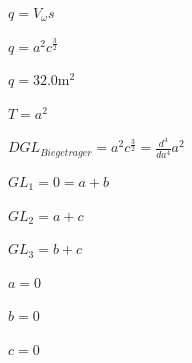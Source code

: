 \documentclass[
]{article}
\begin{document}
\(\displaystyle q = V_{\omega} s\)

\(\displaystyle q = a^{2} c^{\frac{3}{2}}\)

\(\displaystyle q = 32.0 \text{m}^{2}\)

\(\displaystyle T = a^{2}\)

\(\displaystyle DGL_{Biegetrager} = a^{2} c^{\frac{3}{2}} = \frac{d^{4}}{d a^{4}} a^{2}\)

\(\displaystyle GL_{1} = 0 = a + b\)

\(\displaystyle GL_{2} = a + c\)

\(\displaystyle GL_{3} = b + c\)

\(\displaystyle a = 0\)

\(\displaystyle b = 0\)

\(\displaystyle c = 0\)
\end{document}
